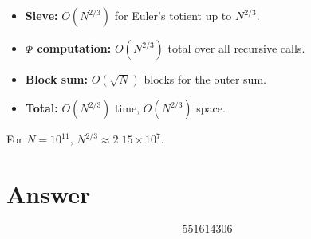 \documentclass[11pt]{article}
\begin{document}
\begin{itemize}
\item \textbf{Sieve:} $O(N^{2/3})$ for Euler's totient up to $N^{2/3}$.
\item \textbf{$\Phi$ computation:} $O(N^{2/3})$ total over all recursive calls.
\item \textbf{Block sum:} $O(\sqrt{N})$ blocks for the outer sum.
\item \textbf{Total:} $O(N^{2/3})$ time, $O(N^{2/3})$ space.
\end{itemize}

For $N = 10^{11}$, $N^{2/3} \approx 2.15 \times 10^7$.

\section{Answer}

\[
\boxed{551614306}
\]
\end{document}
